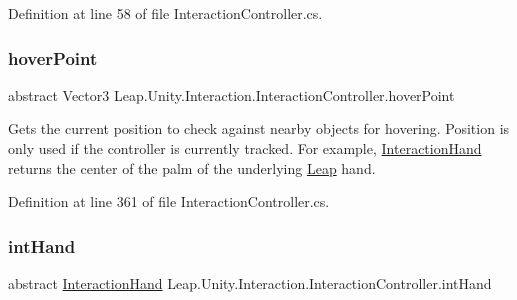 Definition at line 58 of file Interaction\+Controller.\+cs.

\mbox{\label{class_leap_1_1_unity_1_1_interaction_1_1_interaction_controller_a7c2b239ce82be01d82b7d8305dbfe0e5}} 
\subsubsection{\texorpdfstring{hoverPoint}{hoverPoint}}
{\footnotesize\ttfamily abstract Vector3 Leap.\+Unity.\+Interaction.\+Interaction\+Controller.\+hover\+Point\hspace{0.3cm}{\ttfamily [get]}}



Gets the current position to check against nearby objects for hovering. Position is only used if the controller is currently tracked. For example, \mbox{\hyperlink{class_leap_1_1_unity_1_1_interaction_1_1_interaction_hand}{Interaction\+Hand}} returns the center of the palm of the underlying \mbox{\hyperlink{namespace_leap_1_1_unity_1_1_leap}{Leap}} hand. 



Definition at line 361 of file Interaction\+Controller.\+cs.

\mbox{\label{class_leap_1_1_unity_1_1_interaction_1_1_interaction_controller_aa1fbc2fcb4bbb72436b53d5e74b5cd4f}} 
\subsubsection{\texorpdfstring{intHand}{intHand}}
{\footnotesize\ttfamily abstract \mbox{\hyperlink{class_leap_1_1_unity_1_1_interaction_1_1_interaction_hand}{Interaction\+Hand}} Leap.\+Unity.\+Interaction.\+Interaction\+Controller.\+int\+Hand\hspace{0.3cm}{\ttfamily [get]}}



